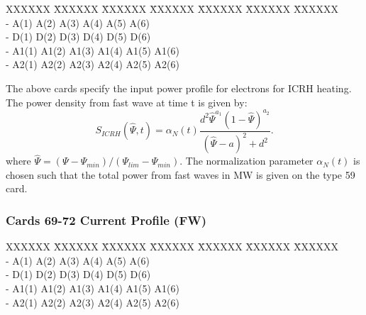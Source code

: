 \begin{tabbing}
XXXXXX \= XXXXXX \= XXXXXX \= XXXXXX \= XXXXXX \= XXXXXX \=XXXXXX
      \\
- \> \footnotesize A(1) \>\footnotesize A(2) \>\footnotesize A(3) \>\footnotesize A(4)
\>\footnotesize A(5) \>\footnotesize A(6)\\
- \> \footnotesize D(1) \>\footnotesize D(2) \>\footnotesize D(3) \>\footnotesize D(4)
\>\footnotesize D(5) \>\footnotesize D(6)\\
- \> \footnotesize A1(1) \>\footnotesize A1(2) \>\footnotesize A1(3) \>\footnotesize A1(4)
\>\footnotesize A1(5) \>\footnotesize A1(6)\\
- \> \footnotesize A2(1) \>\footnotesize A2(2) \>\footnotesize A2(3) \>\footnotesize A2(4)
\>\footnotesize A2(5) \>\footnotesize A2(6)\\
\end{tabbing}
The above cards specify the input power profile for electrons for ICRH heating.
The power density from fast wave at time t is given by:
\begin{equation}
S_{ICRH}(\hat{\Psi},t) ={\alpha}_N(t) \frac{d^2 \hat{\Psi}^{a_{1}}(1-\hat{\Psi})^{a_{2}}}{(\hat{\Psi}-a)^2+d^2} .
\end{equation}
where $\hat{\Psi}=( \Psi - {\Psi}_{min}) / ({\Psi}_{lim}-{\Psi}_{min})$.  The normalization parameter
${\alpha}_N(t)$ is chosen such that the total power from fast waves in MW is given on the type 59 card.
\newpage \subsubsection{Cards 69-72 Current Profile (FW)}
\begin{tabbing}
XXXXXX \= XXXXXX \= XXXXXX \= XXXXXX \= XXXXXX \= XXXXXX \=XXXXXX
      \\
- \> \footnotesize A(1) \>\footnotesize A(2) \>\footnotesize A(3) \>\footnotesize A(4)
\>\footnotesize A(5) \>\footnotesize A(6)\\
- \> \footnotesize D(1) \>\footnotesize D(2) \>\footnotesize D(3) \>\footnotesize D(4)
\>\footnotesize D(5) \>\footnotesize D(6)\\
- \> \footnotesize A1(1) \>\footnotesize A1(2) \>\footnotesize A1(3) \>\footnotesize A1(4)
\>\footnotesize A1(5) \>\footnotesize A1(6)\\
- \> \footnotesize A2(1) \>\footnotesize A2(2) \>\footnotesize A2(3) \>\footnotesize A2(4)
\>\footnotesize A2(5) \>\footnotesize A2(6)\\
\end{tabbing}
